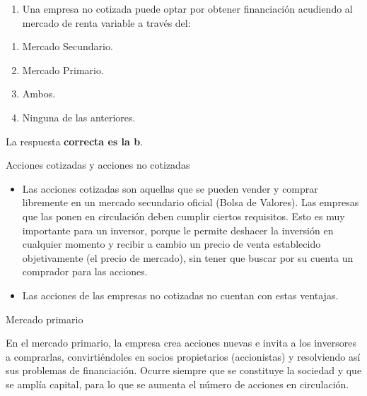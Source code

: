 \documentclass[
  letterpaper,
  DIV=11,
  numbers=noendperiod]{scrreprt}
\providecommand{\tightlist}{%
  \setlength{\itemsep}{0pt}\setlength{\parskip}{0pt}}\usepackage{longtable,booktabs,array}
\begin{document}
\begin{enumerate}
\def\labelenumi{\arabic{enumi}.}
\tightlist
\item
  Una empresa no cotizada puede optar por obtener financiación acudiendo
  al mercado de renta variable a través del:
\end{enumerate}

\begin{enumerate}
\def\labelenumi{\alph{enumi})}
\item
  Mercado Secundario.
\item
  Mercado Primario.
\item
  Ambos.
\item
  Ninguna de las anteriores.
\end{enumerate}

\begin{tcolorbox}[enhanced jigsaw, left=2mm, opacityback=0, colback=white, breakable, arc=.35mm, bottomrule=.15mm, rightrule=.15mm, toprule=.15mm, leftrule=.75mm, colframe=quarto-callout-tip-color-frame]
\begin{minipage}[t]{5.5mm}
\textcolor{quarto-callout-tip-color}{\faLightbulb}
\end{minipage}%
\begin{minipage}[t]{\textwidth - 5.5mm}

La respuesta \textbf{correcta es la b}.

Acciones cotizadas y acciones no cotizadas

\begin{itemize}
\item
  Las acciones cotizadas son aquellas que se pueden vender y comprar
  libremente en un mercado secundario oficial (Bolsa de Valores). Las
  empresas que las ponen en circulación deben cumplir ciertos
  requisitos. Esto es muy importante para un inversor, porque le permite
  deshacer la inversión en cualquier momento y recibir a cambio un
  precio de venta establecido objetivamente (el precio de mercado), sin
  tener que buscar por su cuenta un comprador para las acciones.
\item
  Las acciones de las empresas no cotizadas no cuentan con estas
  ventajas.
\end{itemize}

Mercado primario

En el mercado primario, la empresa crea acciones nuevas e invita a los
inversores a comprarlas, convirtiéndoles en socios propietarios
(accionistas) y resolviendo así sus problemas de financiación. Ocurre
siempre que se constituye la sociedad y que se amplía capital, para lo
que se aumenta el número de acciones en circulación.


\end{minipage}
\end{tcolorbox}
\end{document}
